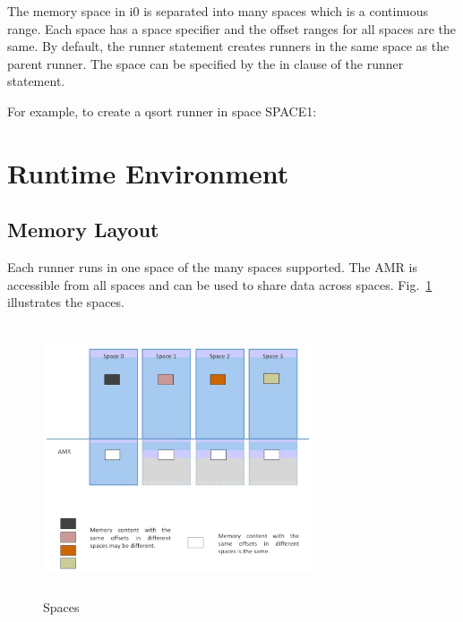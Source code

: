 \documentclass[a4paper]{article}
\DeclareRobustCommand{\mybox}[2][gray!20]{%
\begin{tcolorbox}[   %
        breakable,
        left=0pt,
        right=0pt,
        top=0pt,
        bottom=0pt,
        colback=#1,
        colframe=#1,
        width=\dimexpr\textwidth\relax, 
        enlarge left by=0mm,
        boxsep=5pt,
        arc=0pt,outer arc=0pt,
        ]
        #2
\end{tcolorbox}
}
\begin{document}
{}

The memory space in i0 is separated into many spaces which is a continuous range. Each space has a space specifier and the offset ranges for all spaces are the same. By default, the runner statement creates runners in the same space as the parent runner. The space can be specified by the in clause of the runner statement.

For example, to create a qsort runner in space SPACE1:

\mybox[gray!20]
{\color{blue}{}}

{\color{darkblue}\section{Runtime Environment}}

{\color{lightblue}\subsection{Memory Layout}}

Each runner runs in one space of the many spaces supported. The AMR is accessible from all spaces and can be used to share data across spaces. Fig.~\ref{fig:c0-spaces} illustrates the spaces.

\begin{figure}[htbp]
\begin{center}
  \includegraphics[width=8cm, height=8cm]{figure/spaces.eps}
  \caption{Spaces}
  \label{fig:c0-spaces}
\end{center}
\end{figure}
\end{document}
